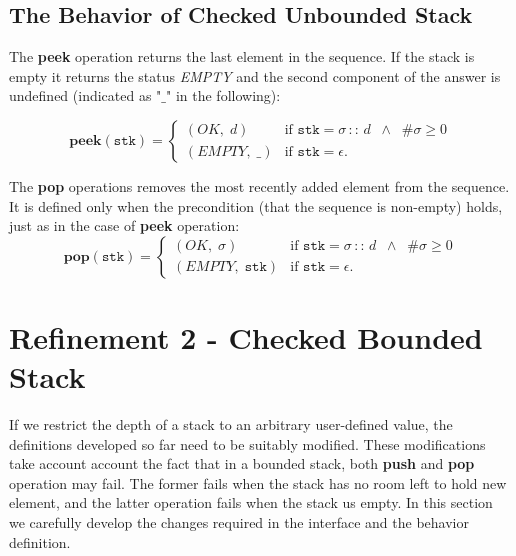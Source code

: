 \documentclass[10pt]{article}
\begin{document}
\subsection{The Behavior of Checked Unbounded Stack}
The \textbf{peek} operation returns the last element in the sequence. If the stack is empty it returns the status \emph{EMPTY} and the second component of the answer is undefined (indicated as "$\_$" in the following):

\[
    \mathtt{\mathbf{peek}(stk)} = \begin{cases} (OK, \; d) & \mbox{if } \mathtt{stk} = \sigma \,\mathbf{::} \,d \;\; \wedge \;\; \#\sigma \geq 0\\ 
    (EMPTY, \; \_)  & \mbox{if }\mathtt{stk} = \epsilon. \end{cases} 
\]

The \textbf{pop} operations removes the most recently added element from the sequence. It is defined only when the precondition (that the sequence is non-empty) holds, just as in the case of \textbf{peek} operation:
\[
    \mathtt{\mathbf{pop}(stk)} = \begin{cases} (OK, \; \sigma) & \mbox{if } \mathtt{stk} = \sigma \,\mathbf{::} \,d \;\; \wedge \;\; \#\sigma \geq 0\\ 
    (EMPTY, \; \mathtt{stk})  & \mbox{if }\mathtt{stk} = \epsilon. \end{cases} 
\]



\section{Refinement 2 - Checked Bounded Stack}
  If we restrict the depth of a stack to an arbitrary user-defined value, the definitions developed so far need to be suitably modified. These modifications take account account the fact that in a bounded stack, both \textbf{push} and \textbf{pop} operation may fail. The former fails when the stack has no room left to hold new element, and the latter operation fails when the stack us empty. In this section we carefully develop the changes required in the interface and the behavior definition.
  
\end{document}
